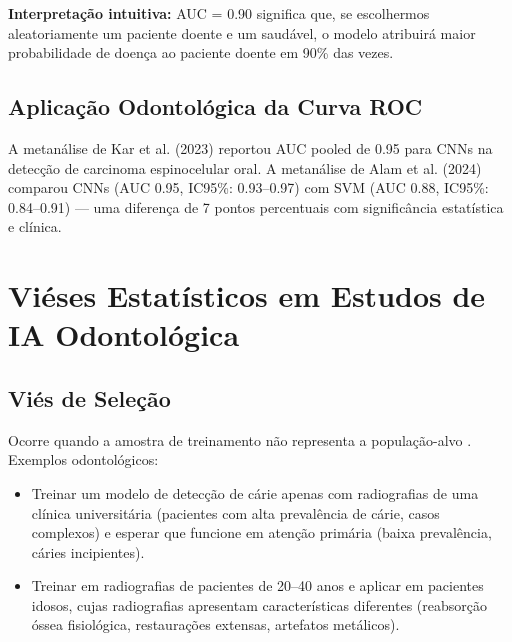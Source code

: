 \textbf{Interpretação intuitiva:} AUC = 0.90 significa que, se escolhermos aleatoriamente um paciente doente e um saudável, o modelo atribuirá maior probabilidade de doença ao paciente doente em 90\% das vezes.

\subsection{Aplicação Odontológica da Curva ROC}

A metanálise de Kar et al. (2023) \cite{ODT-010} reportou AUC pooled de 0.95 para CNNs na detecção de carcinoma espinocelular oral. A metanálise de Alam et al. (2024) \cite{ODT-015} comparou CNNs (AUC 0.95, IC95\%: 0.93--0.97) com SVM (AUC 0.88, IC95\%: 0.84--0.91) — uma diferença de 7 pontos percentuais com significância estatística e clínica.


\section{Viéses Estatísticos em Estudos de IA Odontológica}

\subsection{Viés de Seleção}

Ocorre quando a amostra de treinamento não representa a população-alvo . Exemplos odontológicos:

\begin{itemize}
    \item Treinar um modelo de detecção de cárie apenas com radiografias de uma clínica universitária (pacientes com alta prevalência de cárie, casos complexos) e esperar que funcione em atenção primária (baixa prevalência, cáries incipientes).
    \item Treinar em radiografias de pacientes de 20--40 anos e aplicar em pacientes idosos, cujas radiografias apresentam características diferentes (reabsorção óssea fisiológica, restaurações extensas, artefatos metálicos).
\end{itemize}

